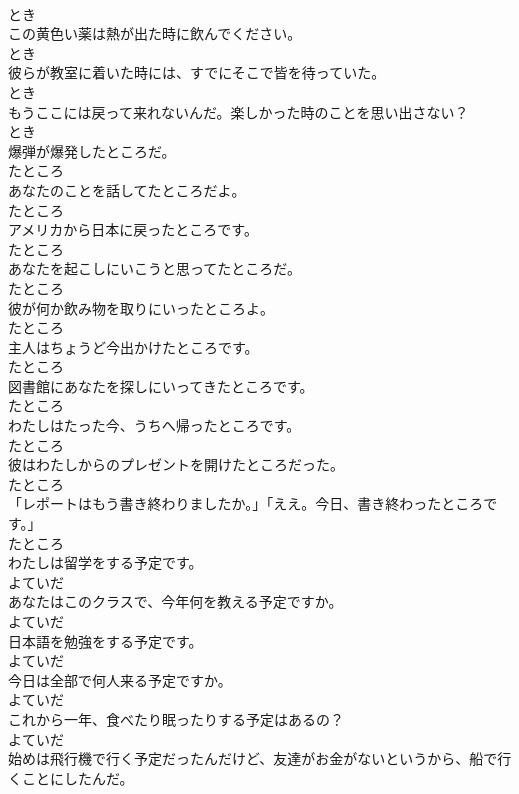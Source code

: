 \documentclass[8pt]{extreport}
\begin{document}
\begin{CJK}{UTF8}{min}
\\	とき
\\	この黄色い薬は熱が出た時に飲んでください。	
\\	とき
\\	彼らが教室に着いた時には、すでにそこで皆を待っていた。	
\\	とき
\\	もうここには戻って来れないんだ。楽しかった時のことを思い出さない？	
\\	とき
\\	爆弾が爆発したところだ。	
\\	たところ
\\	あなたのことを話してたところだよ。	
\\	たところ
\\	アメリカから日本に戻ったところです。	
\\	たところ
\\	あなたを起こしにいこうと思ってたところだ。	
\\	たところ
\\	彼が何か飲み物を取りにいったところよ。	
\\	たところ
\\	主人はちょうど今出かけたところです。	
\\	たところ
\\	図書館にあなたを探しにいってきたところです。	
\\	たところ
\\	わたしはたった今、うちへ帰ったところです。	
\\	たところ
\\	彼はわたしからのプレゼントを開けたところだった。	
\\	たところ
\\	「レポートはもう書き終わりましたか。」「ええ。今日、書き終わったところです。」	
\\	たところ
\\	わたしは留学をする予定です。	
\\	よていだ
\\	あなたはこのクラスで、今年何を教える予定ですか。	
\\	よていだ
\\	日本語を勉強をする予定です。	
\\	よていだ
\\	今日は全部で何人来る予定ですか。	
\\	よていだ
\\	これから一年、食べたり眠ったりする予定はあるの？	
\\	よていだ
\\	始めは飛行機で行く予定だったんだけど、友達がお金がないというから、船で行くことにしたんだ。	

\end{CJK}
\end{document}
